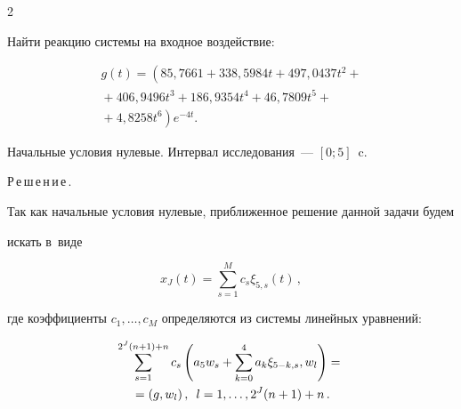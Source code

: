 \begin{multicols}{2}
{}





\noindent


Найти реакцию системы на входное воздействие:


\begin{multline*}


g(t)=\left(85{,}7661+338{,}5984t+497{,}0437t^2+{}\right.\\


{}+406{,}9496t^3+186{,}9354t^4+46{,}7809t^5+{}\\


\left.{}+4{,}8258t^6\right)e^{-4t}.


\end{multline*}


Начальные условия нулевые. Интервал исследования~--- $[0;5]$~c.





\columnbreak














\smallskip





\noindent


Р\,е\,ш\,е\,н\,и\,е\,.


Так как начальные условия нулевые, приближенное решение данной задачи будем  


искать в~виде


$$


x_J(t)=\sum\limits_{s=1}^M c_s {\xi}_{5,s}(t)\,,


$$


где коэффициенты $c_1,\dots, c_M$ определяются из системы линейных уравнений:


\begin{multline*}


\sum\limits_{s=1}^{2^J(n+1)+n} c_s \left(


a_5w_{s}+\sum\limits_{k=0}^4 a_k\xi_{5-k,s},w_l\right)={}\\


{}=


(g,w_l)\,,\enskip 


l=1,\dots,2^J(n+1)+n\,.


\end{multline*}



\end{multicols}
